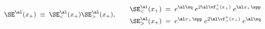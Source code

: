 \begin{equation} 
\SE^{\al}(x_{+})\;
\equiv\;
\SE^{\al}_{<}(x_{+})\SE^{\al}_{>}(x_{+}),
\qquad 
\begin{aligned}
{} & 
\SE^{\al}_<(x_{+})\;=\;
e^{\al \sq}\;
e^{2\al\vf^{{+}}_{<}(x_{+})}\;
e^{\al x_+ \spp}\\
{} & 
\SE^{\al}_>(x_{+})\;=\;
e^{\al x_+ \spp}\;
e^{2\al\vf^{{+}}_{>}(x_{+})}\;
e^{\al\sq} 
\end{aligned}
\end{equation}

